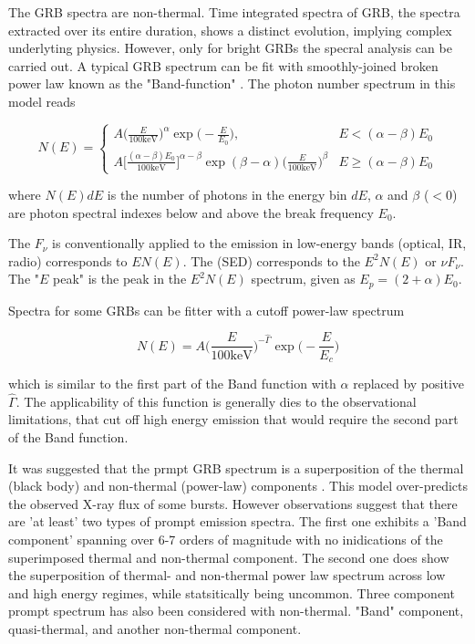 The GRB spectra are non-thermal.
Time integrated spectra of GRB, the spectra extracted over its entire duration, shows a distinct evolution, implying complex underlyting physics. However, only for bright GRBs the specral analysis can be carried out.
A typical GRB spectrum can be fit with smoothly-joined broken power law known as the "Band-function" \cite{Band et al., 1993}. The photon number spectrum in this model reads

\begin{equation}
N(E) = 
\begin{cases}
A\Big( \frac{E}{100 \text{keV}} \Big)^{\alpha} \exp\Big( -\frac{E}{E_0} \Big), &E < (\alpha-\beta)E_0 \\
A\Big[ \frac{(\alpha - \beta)E_0}{100 \text{keV}} \Big]^{\alpha - \beta} \exp(\beta - \alpha) \Big( \frac{E}{100 \text{keV}} \Big)^{\beta} &E\geq (\alpha-\beta)E_0
\end{cases}
\end{equation}

where $N(E)dE$ is the number of photons in the energy bin $dE$, $\alpha$ and $\beta$ ($< 0$) are photon spectral indexes  below and above the break frequency $E_0$.

The  $F_{\nu}$ is conventionally applied to the emission in low-energy bands (optical, IR, radio) corresponds to $EN(E)$. 
The  (SED) corresponds to the $E^2 N(E)$ or $\nu F_{\nu}$.
The "$E$ peak" is the peak in the $E^2N(E)$ spectrum, given as $E_p = (2 + \alpha)E_0$.

Spectra for some GRBs can be fitter with a cutoff power-law spectrum 

\begin{equation}
N(E) = A \Big( \frac{E}{100 \text{keV}} \Big)^{-\hat{\Gamma}} \exp{\Big(-\frac{E}{E_c}\Big)}
\end{equation}

which is similar to the first part of the Band function with $\alpha$ replaced by positive $\hat{\Gamma}$. 
The applicability of this function is generally dies to the observational limitations, that cut off high energy emission that would require the second part of the Band function. 

It was suggested that the prmpt GRB spectrum is a superposition of the thermal (black body) and non-thermal (power-law) components \cite{Ryde, 2004; Ryde and Pe'er, 2009}. This model over-predicts the observed X-ray flux \cite{Ghirlanda et al., 2007; Frontera et al., 2013} of some bursts.
However observations suggest that there are 'at least' two types of prompt emission spectra. The first one exhibits a 'Band component' spanning over 6-7 orders of magnitude with no inidications of the superimposed thermal and non-thermal component. The second one does show the superposition of thermal- and non-thermal power law spectrum across low and high energy regimes, while statsitically being uncommon.
Three component prompt spectrum has also been considered with non-thermal. "Band" component, quasi-thermal, and another non-thermal component.

